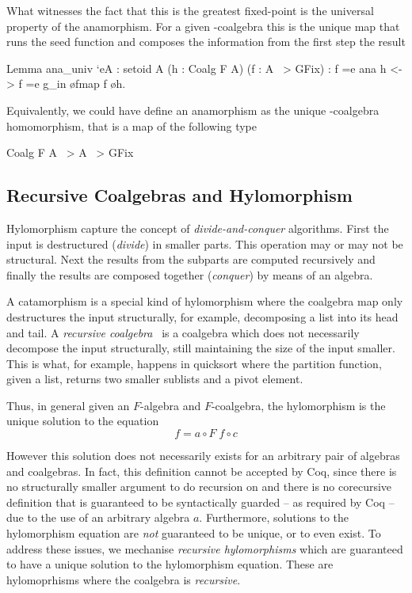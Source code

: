\documentclass[anonymous, a4paper, UKenglish, cleveref, autoref, thm-restate]{lipics-v2021}
\begin{document}
What witnesses the fact that this is the greatest fixed-point is the universal
property of the anamorphism. For a given -coalgebra this is the unique
map that runs the seed function and composes the information from the first step
the result

\begin{coqcode}
Lemma ana_univ `{eA : setoid A} (h : Coalg F A) (f : A ~> GFix)
: f =e ana h <-> f =e g_in \o fmap f \o h.
\end{coqcode}
Equivalently, we could have define an anamorphism as the
unique -coalgebra homomorphism, that is a map of the following type
\begin{coqcode}
Coalg F A ~> A ~> GFix
\end{coqcode}

\subsection{Recursive Coalgebras and Hylomorphism}
\label{sec:rec-coalgebras}
Hylomorphism capture the concept of \emph{divide-and-conquer} algorithms.  First
the input is destructured (\emph{divide}) in smaller parts. This operation may
or may not be structural. Next the results from the subparts are computed
recursively and finally the results are composed together (\emph{conquer}) by
means of an algebra.

A catamorphism is a special kind of hylomorphism where the coalgebra
map  only destructures the input structurally, for example,
decomposing a list into its head and tail. A \emph{recursive
coalgebra}~\cite{AdamekMM19,CaprettaUV04} is a coalgebra which does not
necessarily decompose the input structurally, still maintaining the size of the
input smaller. This is what, for example, happens in quicksort where the
partition function, given a list, returns two smaller sublists and a pivot
element.

Thus, in general given an $F$-algebra and $F$-coalgebra, the hylomorphism is the
unique solution to the equation
\begin{equation}
  \label{eq:hylo}
  f = a \circ F\; f \circ c
\end{equation}

However this solution does not necessarily exists for an arbitrary pair of
algebras and coalgebras. In fact, this definition cannot be accepted by Coq,
since there is no structurally smaller argument to do recursion on and there is
no corecursive definition that is guaranteed to be syntactically guarded -- as
required by Coq -- due to the use of an arbitrary algebra $a$. Furthermore,
solutions to the hylomorphism equation are \emph{not} guaranteed to be unique,
or to even exist. To address these issues, we mechanise \emph{recursive
hylomorphisms} which are guaranteed to have a unique solution to the
hylomorphism equation. These are hylomoprhisms where the coalgebra is
\emph{recursive}.
\end{document}
